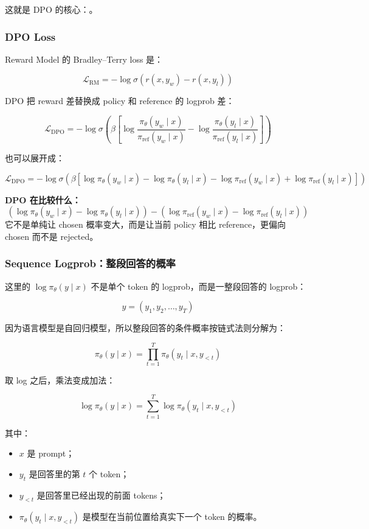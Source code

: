 这就是 DPO 的核心：。

\subsubsection{DPO Loss}

Reward Model 的 Bradley--Terry loss 是：

\[
\mathcal{L}_\text{RM}
=
-
\log
\sigma
\left(
r(x,y_w) - r(x,y_l)
\right)
\]

DPO 把 reward 差替换成 policy 和 reference 的 logprob 差：

\[
\mathcal{L}_\text{DPO}
=
-
\log
\sigma
\left(
\beta
\left[
\log
\frac{\pi_\theta(y_w \mid x)}{\pi_\text{ref}(y_w \mid x)}
-
\log
\frac{\pi_\theta(y_l \mid x)}{\pi_\text{ref}(y_l \mid x)}
\right]
\right)
\]

也可以展开成：

\[
\mathcal{L}_\text{DPO}
=
-
\log
\sigma
\left(
\beta
\left[
\log \pi_\theta(y_w \mid x)
-
\log \pi_\theta(y_l \mid x)
-
\log \pi_\text{ref}(y_w \mid x)
+
\log \pi_\text{ref}(y_l \mid x)
\right]
\right)
\]

\begin{summarybox}
\textbf{DPO 在比较什么：}
\[
\left(
\log \pi_\theta(y_w \mid x)
-
\log \pi_\theta(y_l \mid x)
\right)
-
\left(
\log \pi_\text{ref}(y_w \mid x)
-
\log \pi_\text{ref}(y_l \mid x)
\right)
\]
它不是单纯让 chosen 概率变大，而是让当前 policy 相比 reference，更偏向 chosen 而不是 rejected。
\end{summarybox}

\subsubsection{Sequence Logprob：整段回答的概率}

这里的 $\log \pi_\theta(y \mid x)$ 不是单个 token 的 logprob，而是一整段回答的 logprob：

\[
y = (y_1, y_2, \ldots, y_T)
\]

因为语言模型是自回归模型，所以整段回答的条件概率按链式法则分解为：

\[
\pi_\theta(y \mid x)
=
\prod_{t=1}^{T}
\pi_\theta(y_t \mid x, y_{<t})
\]

取 log 之后，乘法变成加法：

\[
\log \pi_\theta(y \mid x)
=
\sum_{t=1}^{T}
\log \pi_\theta(y_t \mid x, y_{<t})
\]

其中：

\begin{itemize}[leftmargin=1.5em]
  \item $x$ 是 prompt；
  \item $y_t$ 是回答里的第 $t$ 个 token；
  \item $y_{<t}$ 是回答里已经出现的前面 tokens；
  \item $\pi_\theta(y_t \mid x, y_{<t})$ 是模型在当前位置给真实下一个 token 的概率。
\end{itemize}

